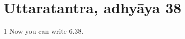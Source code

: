 
\section{Uttaratantra, adhyāya 38}

\begin{translation}

\item [1] Now you can write 6.38. 


\end{translation}
